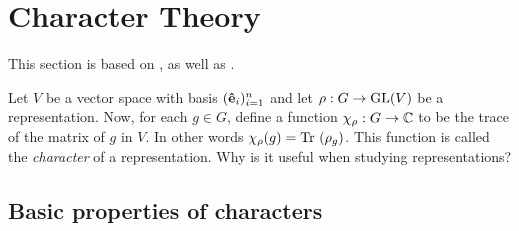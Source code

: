 \clearpage{\thispagestyle{empty}}
\section{Character Theory}

This section is based on \cite[Ch.2.]{Serre}, as well as \cite[Sect.2.2.]{FultonHarris}.

Let $V$ be a vector space with basis $(\mathbf{\hat{e}}_i)_{i=1}^n$ and let $\rho: G \rightarrow \text{GL}(V)$ be a representation. Now, for each $g \in G$, define a function $\chi_{\rho}: G \rightarrow \mathbb{C}$ to be the trace of the matrix of $g$ in $V$. In other words $\chi_{\rho}(g) = \text{Tr }(\rho_g)$. This function is called the \emph{character} of a representation. Why is it useful when studying representations?

\subsection{Basic properties of characters}

